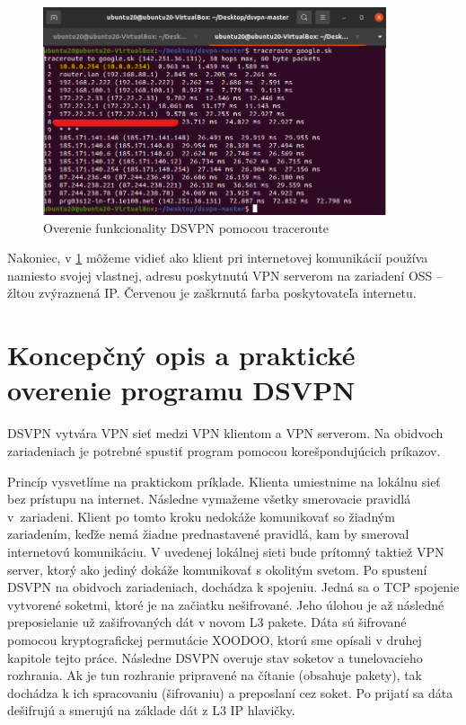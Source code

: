 \begin{figure}[!h]
	\centering
	\includegraphics[width=0.9\textwidth]{figures/vpntru20}
	\caption{Overenie funkcionality DSVPN pomocou traceroute}
	\label{vpntru20}
\end{figure}
Nakoniec, v \ref{vpntru20} môžeme vidieť ako klient pri internetovej komunikácií používa namiesto svojej vlastnej, adresu poskytnutú VPN serverom na zariadení OSS -- žltou zvýraznená IP. Červenou je zaškrnutá farba poskytovateľa internetu. 

\section{Koncepčný opis a praktické overenie programu DSVPN}
DSVPN vytvára VPN sieť medzi VPN klientom a VPN serverom. Na obidvoch zariadeniach je potrebné spustiť program pomocou korešpondujúcich príkazov. 

Princíp vysvetlíme na praktickom príklade. Klienta umiestnime na lokálnu sieť bez prístupu na internet. Následne vymažeme všetky smerovacie pravidlá v~zariadeni. Klient po tomto kroku nedokáže komunikovať so žiadným zariadením, keďže nemá žiadne prednastavené pravidlá, kam by smeroval internetovú komunikáciu. V uvedenej lokálnej sieti bude prítomný taktiež VPN server, ktorý ako jediný dokáže komunikovať s okolitým svetom. Po spustení DSVPN na obidvoch zariadeniach, dochádza k spojeniu. Jedná sa o TCP spojenie vytvorené soketmi, ktoré je na začiatku nešifrované. Jeho úlohou je až následné preposielanie už zašifrovaných dát v novom L3 pakete. Dáta sú šifrované pomocou kryptografickej permutácie XOODOO, ktorú sme opísali v druhej kapitole tejto práce. Následne DSVPN overuje stav soketov a tunelovacieho rozhrania. Ak je tun rozhranie pripravené na čítanie (obsahuje pakety), tak dochádza k ich spracovaniu (šifrovaniu) a preposlaní cez soket. Po prijatí sa dáta dešifrujú a smerujú na základe dát z L3 IP hlavičky. 

